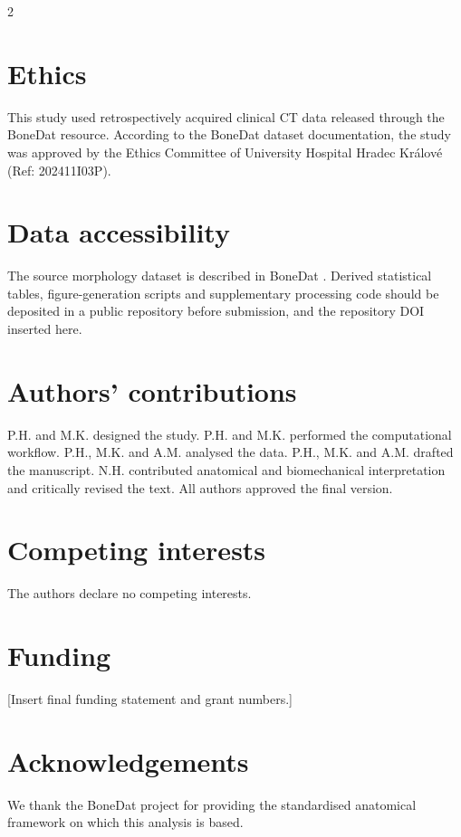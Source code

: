 \documentclass[openacc]{rsproca_new}
\begin{document}
\begin{multicols}{2}
\section*{Ethics}

This study used retrospectively acquired clinical CT data released through the BoneDat resource. According to the BoneDat dataset documentation, the study was approved by the Ethics Committee of University Hospital Hradec Kr\'{a}lov\'{e} (Ref: 202411I03P).

\section*{Data accessibility}

The source morphology dataset is described in BoneDat \cite{HenysKuchar2025}. Derived statistical tables, figure-generation scripts and supplementary processing code should be deposited in a public repository before submission, and the repository DOI inserted here.

\section*{Authors' contributions}

P.H. and M.K. designed the study. P.H. and M.K. performed the computational workflow. P.H., M.K. and A.M. analysed the data. P.H., M.K. and A.M. drafted the manuscript. N.H. contributed anatomical and biomechanical interpretation and critically revised the text. All authors approved the final version.

\section*{Competing interests}

The authors declare no competing interests.

\section*{Funding}

[Insert final funding statement and grant numbers.]

\section*{Acknowledgements}

We thank the BoneDat project for providing the standardised anatomical framework on which this analysis is based.

\end{multicols}
\end{document}
